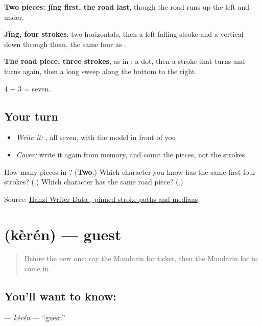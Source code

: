 \begin{quote}
\end{quote}

\textbf{Two pieces: jǐng first, the road last}, though the road runs up the left and under.

\textbf{Jǐng, four strokes}: two horizontals, then a left-falling stroke and a vertical down through them, the same four as .

\textbf{The road piece, three strokes}, as in : a dot, then a stroke that turns and turns again, then a long sweep along the bottom to the right.

4 + 3 = seven.

\subsection*{Your turn}
\begin{itemize}
\raggedright
  \item \emph{Write it:} , all seven, with the model in front of you
  \item \emph{Cover:} write it again from memory, and count the pieces, not the strokes
\end{itemize}

\begin{tcolorbox}[breakable,colback=teal!4,colframe=teal!35!black,title={Before you move on}]
How many pieces in ? (\textbf{Two}.) Which character you know has the same first four strokes? (\textbf{}.) Which character has the same road piece? (\textbf{}.)

Source: \href{https://raw.githubusercontent.com/chanind/hanzi-writer-data/68d10a4b21150cae5e1ebbd223eed289cf32d90c/data/\%E8\%BF\%9B.json}{Hanzi Writer Data , pinned stroke paths and medians}.
\end{tcolorbox}
\section[\texorpdfstring{\zh{客人} (kèrén)}{客人 (kèrén)}]{ (kèrén) — guest}

\label{lesson:ZH-C74-keren}



\begin{quote}
Before the new one: say the Mandarin for ticket, then the Mandarin for to come in.
\end{quote}

\subsection*{You'll want to know: }
\textbf{} — \emph{kèrén} — \textquotedblleft{}guest\textquotedblright{}.

